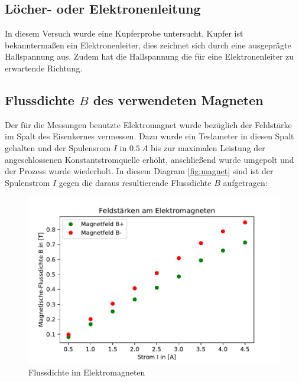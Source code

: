 \subsection{Löcher- oder Elektronenleitung}
\label{sec:leiterart}
In diesem Versuch wurde eine Kupferprobe untersucht, Kupfer ist bekanntermaßen ein Elektronenleiter, dies 
zeichnet sich durch eine ausgeprägte Hallspannung aus. Zudem hat die Hallspannung die für eine Elektronenleiter
zu erwartende Richtung.
\subsection{Flussdichte $B$ des verwendeten Magneten}
\label{sec:verwendeterMagnet}
Der für die Messungen benutzte Elektromagnet wurde bezüglich der Feldstärke im Spalt des Eisenkernes vermessen.
Dazu wurde ein Teslameter in diesen Spalt gehalten und der Spulensrom $I$ in $\SI{0,5}{A}$ bis zur maximalen Leistung 
der angeschlossenen Konstantstromquelle erhöht, anschließend wurde umgepolt und der Prozess wurde wiederholt. 
In diesem Diagram \autoref{fig:magnet} sind ist der Spulenstrom $I$ gegen die daraus resultierende 
Flussdichte $B$ aufgetragen:
\begin{figure}
    \centering
    \includegraphics{plot.pdf}
    \caption{Flussdichte im Elektromagneten}
    \label{fig:magnet}
  \end{figure}

